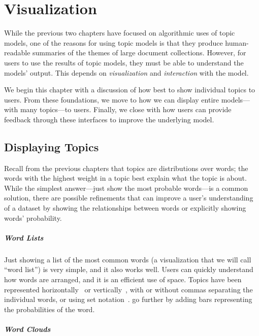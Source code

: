 \chapter{Visualization}
\label{ch:viz}

While the previous two chapters have focused on algorithmic uses of topic
models, one of the reasons for using topic models is that they produce
human-readable summaries of the themes of large document collections.  However,
for users to use the results of topic models, they must be able to understand
the models' output.  This depends on \emph{visualization} and \emph{interaction}
with the model.

We begin this chapter with a discussion of how best to show individual topics to
users.  From these foundations, we move to how we can display entire
models---with many topics---to users.  Finally, we close with how users can
provide feedback through these interfaces to improve the underlying model.

\section{Displaying Topics}
\label{sec:display}

Recall from the previous chapters that topics are distributions over words; the
words with the highest weight in a topic best explain what the topic is about.
While the simplest answer---just show the most probable words---is a common
solution, there are possible refinements that can improve a user's understanding
of a dataset by showing the relationships between words or explicitly showing
words' probability.

\paragraph{Word Lists}

Just showing a list of the most common words (a
visualization that we will call ``word list'') is very simple, and it also works well.
Users can quickly understand how words are arranged, and it is an efficient use of
space. 
Topics have been represented horizontally~\cite{gardner2010topic,smith2015visual} or
vertically~\cite{eisenstein2012topicviz,chaney2012visualizing}, with or without
commas separating the individual words, or using set
notation~\cite{chaney2012visualizing}.  \citet{smith2015visual} go further by
adding bars representing the probabilities of the word.

\paragraph{Word Clouds}

